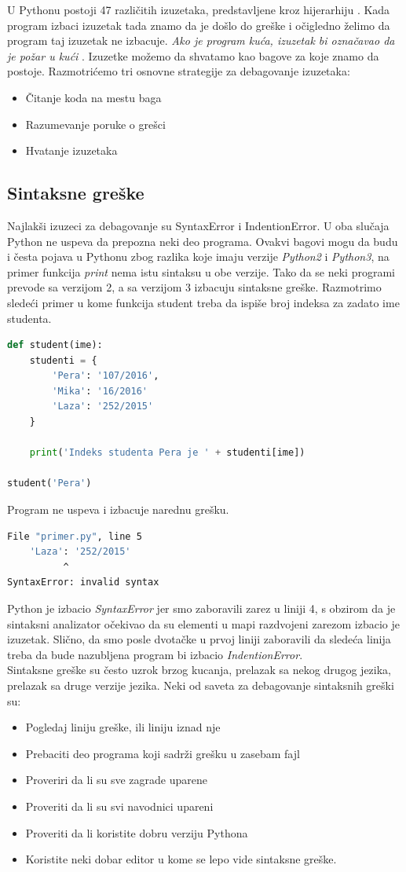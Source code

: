 \documentclass[a4paper]{article}
\begin{document}
U Pythonu postoji 47 različitih izuzetaka, predstavljene kroz hijerarhiju \cite{excDocPyt}. Kada program izbaci izuzetak tada znamo da je došlo do greške i očigledno želimo da program taj izuzetak ne izbacuje. \emph{Ako je program kuća, izuzetak bi označavao da je požar u kući} \cite{proPyDeb}. Izuzetke možemo da shvatamo kao bagove za koje znamo da postoje. Razmotrićemo tri osnovne strategije za debagovanje izuzetaka:
\begin{itemize}
\item Čitanje koda na mestu baga
\item Razumevanje poruke o grešci
\item Hvatanje izuzetaka
\end{itemize}
\subsection{Sintaksne greške}
Najlakši izuzeci za debagovanje su SyntaxError i IndentionError. U oba slučaja Python ne uspeva da prepozna neki deo programa. Ovakvi bagovi mogu da budu i česta pojava u Pythonu zbog razlika koje imaju verzije \emph{Python2} i \emph{Python3}, na primer funkcija \emph{print} nema istu sintaksu u obe verzije. Tako da se neki programi prevode sa verzijom 2, a sa verzijom 3 izbacuju sintaksne greške. Razmotrimo sledeći primer u kome funkcija student treba da ispiše broj indeksa za zadato ime studenta.
\begin{lstlisting}[language = Python, caption={Primer neki}]
def student(ime):
    studenti = {
        'Pera': '107/2016',
        'Mika': '16/2016'
        'Laza': '252/2015'
    }

    print('Indeks studenta Pera je ' + studenti[ime])

student('Pera')
\end{lstlisting}
Program ne uspeva i izbacuje narednu grešku.
\begin{lstlisting}[language = bash, caption = {ispis}]
  File "primer.py", line 5
    'Laza': '252/2015'
          ^
SyntaxError: invalid syntax
\end{lstlisting}
Python je izbacio \emph{SyntaxError} jer smo zaboravili zarez u liniji 4, s obzirom da je sintaksni analizator očekivao da su elementi u mapi razdvojeni zarezom izbacio je izuzetak. Slično, da smo posle dvotačke u prvoj liniji zaboravili da sledeća linija treba da bude nazubljena program bi izbacio \emph{IndentionError}.\\
Sintaksne greške su često uzrok brzog kucanja, prelazak sa nekog drugog jezika, prelazak sa druge verzije jezika. Neki od saveta za debagovanje sintaksnih greški su: 
\begin{itemize}
\item Pogledaj liniju greške, ili liniju iznad nje
\item Prebaciti deo programa koji sadrži grešku u zasebam fajl
\item Proveriri da li su sve zagrade uparene 
\item Proveriti da li su svi navodnici upareni
\item Proveriti da li koristite dobru verziju Pythona
\item Koristite neki dobar editor u kome se lepo vide sintaksne greške.
\end{itemize}
\end{document}
